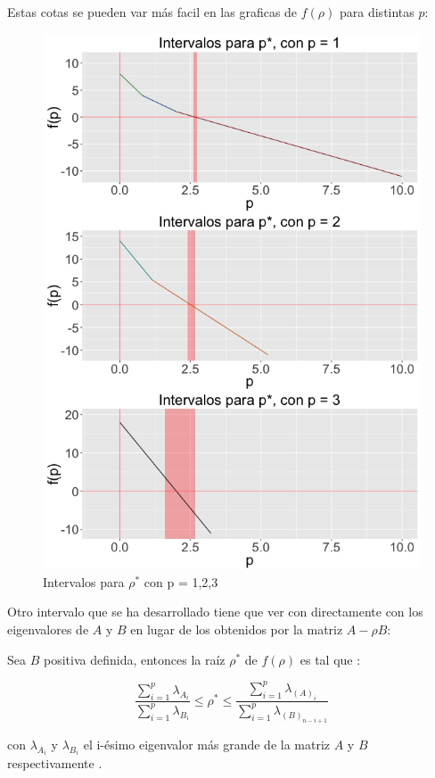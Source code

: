 \begin{example}
 Estas cotas se pueden var más facil en las graficas de $f(\rho)$ para distintas $p$:
\pagebreak

\begin{figure}[!ht]
  \centering
  \includegraphics[width=1\textwidth]{Figures/Chapter2_grid3eigen_interv}  
  \caption{Intervalos para $\rho^*$ con p = 1,2,3}
\end{figure}
\pagebreak

\end{example}

Otro intervalo que se ha desarrollado tiene que ver con directamente con los eigenvalores de $A$ y $B$ en lugar de los obtenidos por la matriz $A-\rho B$:

\begin{proposition}
Sea $B$ positiva definida, entonces la raíz $\rho^*$ de $f(\rho)$ es tal que \cite{ngo2012trace}:

\begin{equation*}
\frac{\sum_{i = 1}^{p}\lambda_{A_i}}{\sum_{i = 1}^{p}\lambda_{B_i}} \leq \rho^* \leq \frac{\sum_{i = 1}^{p}\lambda_{(A)_i}}{\sum_{i = 1}^{p}\lambda_{(B)_{n-i+1}}}	
\end{equation*}

con $\lambda_{A_i}$ y $\lambda_{B_i}$ el i-ésimo eigenvalor más grande  de la matriz $A$ y $B$ respectivamente \cite{ngo2012trace}. 
\end{proposition}


